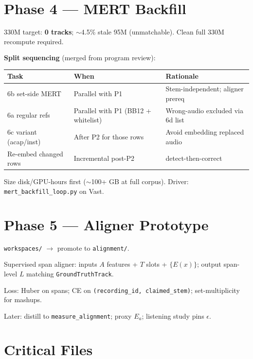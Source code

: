 \documentclass[11pt,a4paper]{article}
\begin{document}
\section{Phase 4 --- MERT Backfill}\label{sec:mert}

330M target: \textbf{0 tracks}; ${\sim}$4.5\% stale 95M (unmatchable). Clean full 330M recompute required.

\textbf{Split sequencing} (merged from program review):

\begin{center}
\begin{tabular}{@{}lll@{}}
\toprule
Task & When & Rationale \\
\midrule
6b set-side MERT & Parallel with P1 & Stem-independent; aligner prereq \\
6a regular refs & Parallel with P1 (BB12 + whitelist) & Wrong-audio excluded via 6d list \\
6c variant (acap/inst) & After P2 for those rows & Avoid embedding replaced audio \\
Re-embed changed rows & Incremental post-P2 & detect-then-correct \\
\bottomrule
\end{tabular}
\end{center}

Size disk/GPU-hours first (${\sim}$100+ GB at full corpus). Driver: \texttt{mert\_backfill\_loop.py} on Vast.

\section{Phase 5 --- Aligner Prototype}

\texttt{workspaces/} $\to$ promote to \texttt{alignment/}.

Supervised span aligner: inputs $A$ features + $T$ slots + $\{E(x)\}$; output span-level $L$
matching \texttt{GroundTruthTrack}.

Loss: Huber on spans; CE on \texttt{(recording\_id, claimed\_stem)}; set-multiplicity for mashups.

Later: distill to \texttt{measure\_alignment}; proxy $E_a$; listening study pins $\epsilon$.

\section{Critical Files}
\end{document}
